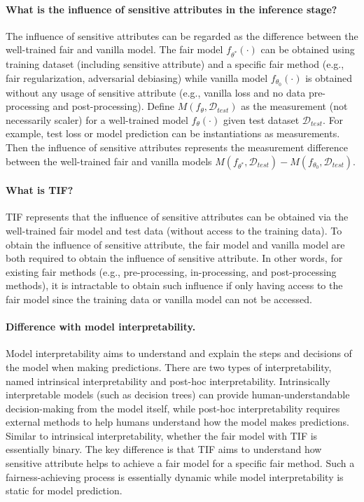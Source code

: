 \documentclass[letterpaper]{article} %
\theoremstyle{plain}
\theoremstyle{definition}
\theoremstyle{remark}
\begin{document}
\paragraph{What is the influence of sensitive attributes in the inference stage?} The influence of sensitive attributes can be regarded as the difference between the well-trained fair and vanilla model. The fair model $f_{\theta^*}(\cdot)$ can be obtained using training dataset (including sensitive attribute) and a specific fair method (e.g., fair regularization, adversarial debiasing) while vanilla model $f_{\theta_0}(\cdot)$ is obtained without any usage of sensitive attribute (e.g., vanilla loss and no data pre-processing and post-processing). Define $M(f_{\theta}, \mathcal{D}_{test})$ as the measurement (not necessarily scaler) for a well-trained model $f_{\theta}(\cdot)$ given test dataset $\mathcal{D}_{test}$. For example, test loss or model prediction can be instantiations as measurements. Then the influence of sensitive attributes represents the measurement difference between the well-trained fair and vanilla models $M(f_{\theta^*}, \mathcal{D}_{test})-M(f_{\theta_0}, \mathcal{D}_{test})$.

\paragraph{What is TIF?} TIF represents that the influence of sensitive attributes can be obtained via the well-trained fair model and test data (without access to the training data). To obtain the influence of sensitive attribute, the fair model and vanilla model are both required to obtain the influence of sensitive attribute. In other words, for existing fair methods (e.g., pre-processing, in-processing, and post-processing methods), it is intractable to obtain such influence if only having access to the fair model since the training data or vanilla model can not be accessed.

\paragraph{Difference with model interpretability.}   Model interpretability aims to understand and explain the steps and decisions of the model when making predictions. There are two types of interpretability, named intrinsical interpretability and post-hoc interpretability. Intrinsically interpretable models (such as decision trees) can provide human-understandable decision-making from the model itself, while post-hoc interpretability requires external methods to help humans understand how the model makes predictions. Similar to intrinsical interpretability, whether the fair model with TIF is essentially binary. The key difference is that TIF aims to understand how sensitive attribute helps to achieve a fair model for a specific fair method. Such a fairness-achieving process is essentially dynamic while model interpretability is static for model prediction.
\end{document}

